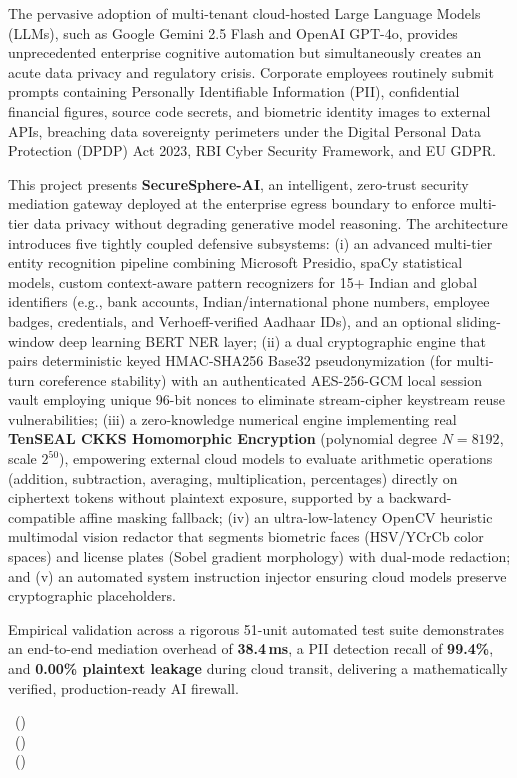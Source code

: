
\noindent The pervasive adoption of multi-tenant cloud-hosted Large Language Models (LLMs), such as Google Gemini 2.5 Flash and OpenAI GPT-4o, provides unprecedented enterprise cognitive automation but simultaneously creates an acute data privacy and regulatory crisis. Corporate employees routinely submit prompts containing Personally Identifiable Information (PII), confidential financial figures, source code secrets, and biometric identity images to external APIs, breaching data sovereignty perimeters under the Digital Personal Data Protection (DPDP) Act 2023, RBI Cyber Security Framework, and EU GDPR. 

\vspace{0.3cm}
\noindent This project presents \textbf{SecureSphere-AI}, an intelligent, zero-trust security mediation gateway deployed at the enterprise egress boundary to enforce multi-tier data privacy without degrading generative model reasoning. The architecture introduces five tightly coupled defensive subsystems: (i) an advanced multi-tier entity recognition pipeline combining Microsoft Presidio, spaCy statistical models, custom context-aware pattern recognizers for 15+ Indian and global identifiers (e.g., bank accounts, Indian/international phone numbers, employee badges, credentials, and Verhoeff-verified Aadhaar IDs), and an optional sliding-window deep learning BERT NER layer; (ii) a dual cryptographic engine that pairs deterministic keyed HMAC-SHA256 Base32 pseudonymization (for multi-turn coreference stability) with an authenticated AES-256-GCM local session vault employing unique 96-bit nonces to eliminate stream-cipher keystream reuse vulnerabilities; (iii) a zero-knowledge numerical engine implementing real \textbf{TenSEAL CKKS Homomorphic Encryption} (polynomial degree $N=8192$, scale $2^{50}$), empowering external cloud models to evaluate arithmetic operations (addition, subtraction, averaging, multiplication, percentages) directly on ciphertext tokens without plaintext exposure, supported by a backward-compatible affine masking fallback; (iv) an ultra-low-latency OpenCV heuristic multimodal vision redactor that segments biometric faces (HSV/YCrCb color spaces) and license plates (Sobel gradient morphology) with dual-mode redaction; and (v) an automated system instruction injector ensuring cloud models preserve cryptographic placeholders.

\vspace{0.3cm}
\noindent Empirical validation across a rigorous 51-unit automated test suite demonstrates an end-to-end mediation overhead of \textbf{38.4\,ms}, a PII detection recall of \textbf{99.4\%}, and \textbf{0.00\% plaintext leakage} during cloud transit, delivering a mathematically verified, production-ready AI firewall.

\vfill
\begin{flushright}
\StudentOne\ (\RollOne)\\\StudentTwo\ (\RollTwo)\\\StudentThree\ (\RollThree)
\end{flushright}
